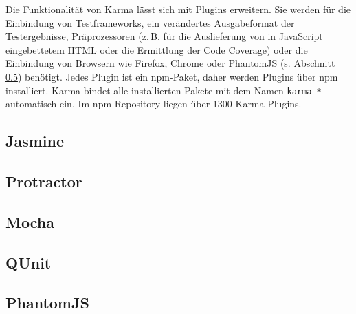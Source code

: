 \begin{figure}[H]
	
\end{figure}

Die Funktionalität von Karma lässt sich mit Plugins erweitern. Sie werden für die Einbindung von Testframeworks, ein verändertes Ausgabeformat der Testergebnisse, Präprozessoren (z.\,B. für die Auslieferung von in JavaScript eingebettetem HTML oder die Ermittlung der Code Coverage)\cite{karma-preprocessors} oder die Einbindung von Browsern wie Firefox, Chrome oder PhantomJS (s. Abschnitt \ref{sec:PhantomJS}) benötigt. Jedes Plugin ist ein npm-Paket, daher werden Plugins über npm installiert. Karma bindet alle installierten Pakete mit dem Namen \texttt{karma-*} automatisch ein.\cite{karma-plugins} Im npm-Repository liegen über 1300 Karma-Plugins.\cite{karma-npm}

\subsection{Jasmine}
\label{sec:Jasmine}

\subsection{Protractor}
\label{sec:Protractor}

\subsection{Mocha}
\label{sec:Mocha}

\subsection{QUnit}
\label{sec:QUnit}

\subsection{PhantomJS}
\label{sec:PhantomJS}